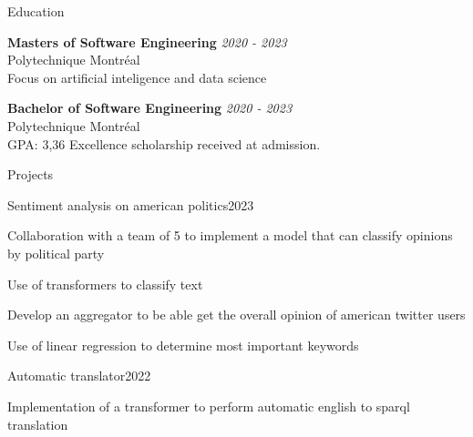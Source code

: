 \documentclass{resume} %
\begin{document}
	
	
	\begin{rSection}{Education}

		{\bf Masters of Software Engineering} \hfill {\em 2020 - 2023} 
		\\ Polytechnique Montréal
		\\ Focus on artificial inteligence and data science
		
		{\bf Bachelor of Software Engineering} \hfill {\em 2020 - 2023} 
		\\ Polytechnique Montréal
		\\GPA: 3,36 \hspace{0.5cm}  Excellence scholarship received at admission.
		
		
	\end{rSection}
	
	\begin{rSection}{Projects}
		\begin{rSubsection}{Sentiment analysis on american politics}{2023}{}{}
			\item Collaboration with a team of 5 to implement a model that can classify opinions by political party
			\item Use of transformers to classify text
			\item Develop an aggregator to be able get the overall opinion of american twitter users
			\item Use of linear regression to determine most important keywords
		 \end{rSubsection}
		\begin{rSubsection}{Automatic translator}{2022}{}{}
			\item Implementation of a transformer to perform automatic english to sparql translation
		 \end{rSubsection}
		
	\end{rSection}
	
	
	
\end{document}
